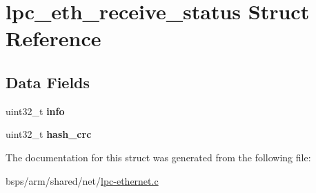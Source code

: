 \hypertarget{structlpc__eth__receive__status}{}\section{lpc\+\_\+eth\+\_\+receive\+\_\+status Struct Reference}
\label{structlpc__eth__receive__status}
\subsection*{Data Fields}
\begin{DoxyCompactItemize}
\item 
\mbox{\label{structlpc__eth__receive__status_aa83944c31d39013f5048fe5383c7c9f8}} 
uint32\+\_\+t {\bfseries info}
\item 
\mbox{\label{structlpc__eth__receive__status_ae453abe6d68f56f8ce72306532021ea3}} 
uint32\+\_\+t {\bfseries hash\+\_\+crc}
\end{DoxyCompactItemize}


The documentation for this struct was generated from the following file\+:\begin{DoxyCompactItemize}
\item 
bsps/arm/shared/net/\mbox{\hyperlink{lpc-ethernet_8c}{lpc-\/ethernet.\+c}}\end{DoxyCompactItemize}
